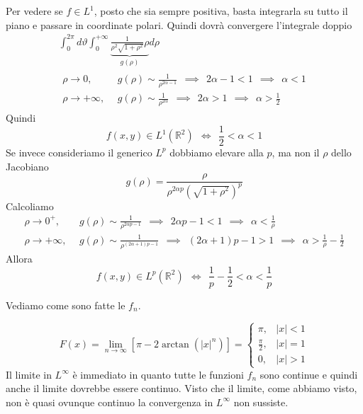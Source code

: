 Per vedere se $f\in L^{1}$, posto che sia sempre positiva, basta integrarla su tutto il piano e passare in coordinate polari. Quindi dovrà convergere l'integrale doppio
\begin{gather*}
\int ^{2\pi }_{0} d\vartheta \int ^{+\infty }_{0}\underbrace{\frac{1}{\rho ^{2}\sqrt{1+\rho ^{2}}} \rho }_{g( \rho )} d\rho \\
\begin{aligned}
\rho \rightarrow 0, & \ \ g(\rho )\sim \frac{1}{\rho ^{2\alpha -1}} \ \ \implies \ \ 2\alpha -1< 1\ \ \implies \ \ \alpha < 1\\
\rho \rightarrow +\infty , & \ \ g(\rho )\sim \frac{1}{\rho ^{2\alpha }} \ \ \implies \ \ 2\alpha  >1\ \ \implies \ \ \alpha  >\frac{1}{2}
\end{aligned}
\end{gather*}
Quindi
\begin{equation*}
f(x,y)\in L^{1} (\mathbb{R}^{2} )\ \ \iff \ \ \frac{1}{2} < \alpha < 1
\end{equation*}
Se invece consideriamo il generico $L^{p}$ dobbiamo elevare alla $p$, ma non il $\rho $ dello Jacobiano
\begin{equation*}
g(\rho )=\frac{\rho }{\rho ^{2\alpha p}\left(\sqrt{1+\rho ^{2}}\right)^{p}}
\end{equation*}
Calcoliamo
\begin{equation*}
\begin{aligned}
\rho \rightarrow 0^{+} , & \ \ g(\rho )\sim \frac{1}{\rho ^{2\alpha p-1}} \ \ \implies \ \ 2\alpha p-1< 1\ \ \implies \ \ \alpha < \frac{1}{\rho }\\
\rho \rightarrow +\infty , & \ \ g(\rho )\sim \frac{1}{\rho ^{(2\alpha +1)p-1}} \ \ \implies \ \ (2\alpha +1)p-1 >1\ \ \implies \ \ \alpha  >\frac{1}{\rho } -\frac{1}{2}
\end{aligned}
\end{equation*}
Allora
\begin{equation*}
f(x,y)\in L^{p} (\mathbb{R}^{2} )\ \ \iff \ \ \frac{1}{p} -\frac{1}{2} < \alpha < \frac{1}{p}
\end{equation*}
\Soluzione

Vediamo come sono fatte le $f_{n}$.

\begin{equation*}
F(x)=\lim _{n\rightarrow \infty }\left[ \pi -2\arctan (|x|^{n} )\right] =\begin{cases}
\pi , & |x|< 1\\
\frac{\pi }{2} , & |x|=1\\
0, & |x| >1
\end{cases}
\end{equation*}
Il limite in $L^{\infty }$ è immediato in quanto tutte le funzioni $f_{n}$ sono continue e quindi anche il limite dovrebbe essere continuo. Visto che il limite, come abbiamo visto, non è quasi ovunque continuo la convergenza in $L^{\infty }$ non sussiste.

